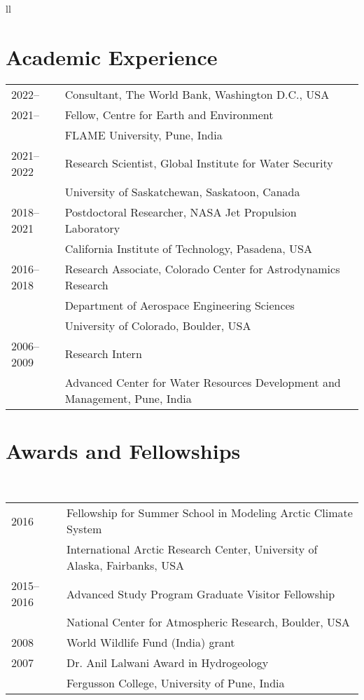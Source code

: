 ll\documentclass[10pt]{article}
\begin{document}
\section*{Academic Experience}
\hline
\label{academic-experience}
\begin{tabular}{ l l }
2022-- & Consultant, The World Bank, Washington D.C., USA\\ 
2021-- & Fellow, Centre for Earth and Environment \\
{} & FLAME University, Pune, India \\
2021--2022 & Research Scientist, Global Institute for Water Security\\ 
{} & University of Saskatchewan, Saskatoon, Canada \\ 
2018--2021 & Postdoctoral Researcher, NASA Jet Propulsion Laboratory \\
{} & California Institute of Technology, Pasadena, USA \\
2016--2018 & Research Associate, Colorado Center for Astrodynamics Research \\
{} &  Department of Aerospace Engineering Sciences \\
{} & University of Colorado, Boulder, USA \\                    
2006--2009 & Research Intern \\
{} & Advanced Center for Water Resources Development and Management, Pune, India \\
\end{tabular} 

\section*{Awards and Fellowships}
\hline
\label{awards-and-fellowships}\\
\begin{tabular}{ l l }
2016 & Fellowship for Summer School in Modeling Arctic Climate System \\
{} & International Arctic Research Center, University of Alaska, Fairbanks, USA \\
2015--2016 & Advanced Study Program Graduate Visitor Fellowship \\
{} & National Center for Atmospheric Research, Boulder, USA \\
2008 & World Wildlife Fund (India) grant \\
2007 &Dr. Anil Lalwani Award in Hydrogeology \\
{} & Fergusson College, University of Pune, India \\
\end{tabular}
\end{document}
